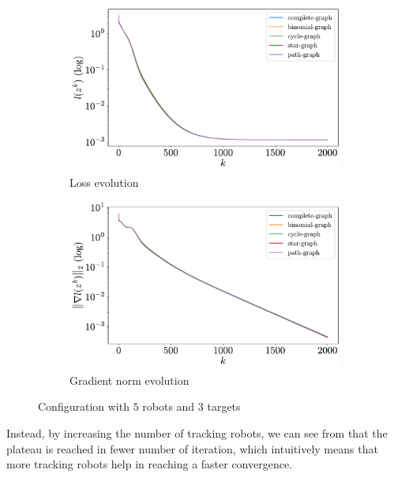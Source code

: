 \documentclass[a4paper,11pt,oneside]{book}
\begin{document}
\begin{figure}[ht]
      \centering
      \begin{subfigure}[t]{0.49\textwidth}
            \centering
            \includegraphics[width=\linewidth]{./figs/tracking/loss_5_3_2_2000.pdf} 
            \caption{Loss evolution}
      \end{subfigure}
      \hfill
      \begin{subfigure}[t]{0.49\textwidth}
            \centering
            \includegraphics[width=\linewidth]{./figs/tracking/gradient_5_3_2_2000.pdf} 
            \caption{Gradient norm evolution}
      \end{subfigure}
      \caption{Configuration with $5$ robots and $3$ targets}
      \label{fig:tracking_5_3}
\end{figure}

Instead, by increasing the number of tracking robots, we can see from  that the plateau is reached in fewer number of iteration, which intuitively means that more tracking robots help in reaching a faster convergence.
\end{document}
